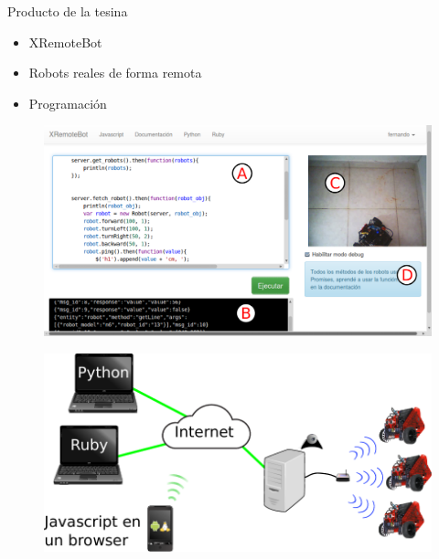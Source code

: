 \documentclass{beamer}
\begin{document}
\begin{frame}{Producto de la tesina}
    \begin{minipage}{0.5\linewidth}
        \begin{itemize}
            \item XRemoteBot
            \item Robots reales de forma remota
            \item Programación
        \end{itemize}
    \end{minipage}%
    \begin{minipage}{0.5\linewidth}
        \begin{figure}
            \includegraphics[width=\linewidth]{images/xremotebot_gui}
        \end{figure}
        \begin{figure}
            \includegraphics[width=\linewidth]{images/arquitectura_propuesta_wan}
        \end{figure}
    \end{minipage}
\end{frame}
\end{document}
